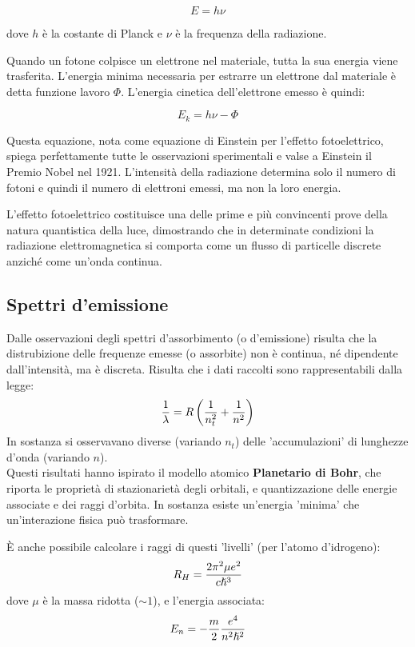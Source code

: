 \[
	E = h\nu
\]

dove $h$ è la costante di Planck e $\nu$ è la frequenza della radiazione.

Quando un fotone colpisce un elettrone nel materiale, tutta la sua energia viene trasferita. L'energia minima necessaria per estrarre un elettrone dal materiale è detta funzione lavoro $\Phi$. L'energia cinetica dell'elettrone emesso è quindi:

\[
	E_k = h\nu - \Phi
\]

Questa equazione, nota come equazione di Einstein per l'effetto fotoelettrico, spiega perfettamente tutte le osservazioni sperimentali e valse a Einstein il Premio Nobel nel 1921. L'intensità della radiazione determina solo il numero di fotoni e quindi il numero di elettroni emessi, ma non la loro energia.

L'effetto fotoelettrico costituisce una delle prime e più convincenti prove della natura quantistica della luce, dimostrando che in determinate condizioni la radiazione elettromagnetica si comporta come un flusso di particelle discrete anziché come un'onda continua.


\subsection{Spettri d'emissione}
Dalle osservazioni degli spettri d'assorbimento (o d'emissione) risulta che la distrubizione delle frequenze emesse (o assorbite) non è continua, né dipendente dall'intensità, ma è discreta. Risulta che i dati raccolti sono rappresentabili dalla legge:
\[
	\frac{1}{\lambda} = R \left(\frac{1}{n_t^2} + \frac{1}{n^2}\right)
\]
In sostanza si osservavano diverse (variando $n_t$) delle 'accumulazioni' di lunghezze d'onda (variando $n$).\\
Questi risultati hanno ispirato il modello atomico \textbf{Planetario di Bohr}, che riporta le proprietà di stazionarietà degli orbitali, e quantizzazione delle energie associate e dei raggi d'orbita. In sostanza esiste un'energia 'minima' che un'interazione fisica può trasformare.

È anche possibile calcolare i raggi di questi 'livelli' (per l'atomo d'idrogeno):
\[
	R_H = \frac{2\pi^2 \mu e^2}{c \hslash^3}
\]
dove $\mu$ è la massa ridotta ($\sim 1$), e l'energia associata:
\[
E_n = -\frac{m}{2}\frac{e^4}{n^2 \hslash^2}
\]

